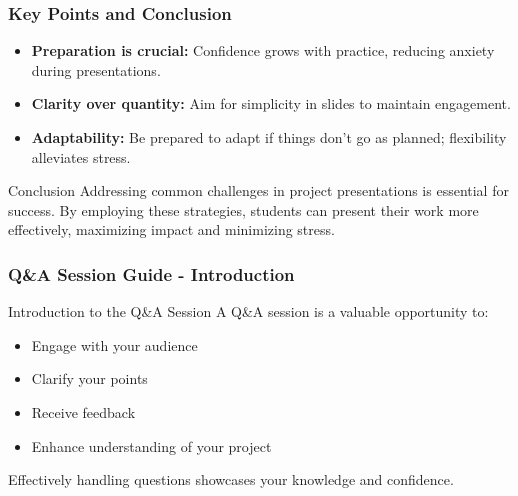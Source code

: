 \documentclass{beamer}
\begin{document}
\begin{frame}[fragile]
    \frametitle{Key Points and Conclusion}
    \begin{itemize}
        \item \textbf{Preparation is crucial:} Confidence grows with practice, reducing anxiety during presentations.
        \item \textbf{Clarity over quantity:} Aim for simplicity in slides to maintain engagement.
        \item \textbf{Adaptability:} Be prepared to adapt if things don’t go as planned; flexibility alleviates stress.
    \end{itemize}
    
    \begin{block}{Conclusion}
        Addressing common challenges in project presentations is essential for success. By employing these strategies, students can present their work more effectively, maximizing impact and minimizing stress.
    \end{block}
\end{frame}

\begin{frame}[fragile]
    \frametitle{Q\&A Session Guide - Introduction}
    \begin{block}{Introduction to the Q\&A Session}
        A Q\&A session is a valuable opportunity to:
        \begin{itemize}
            \item Engage with your audience
            \item Clarify your points
            \item Receive feedback
            \item Enhance understanding of your project
        \end{itemize}
        Effectively handling questions showcases your knowledge and confidence.
    \end{block}
\end{frame}
\end{document}
